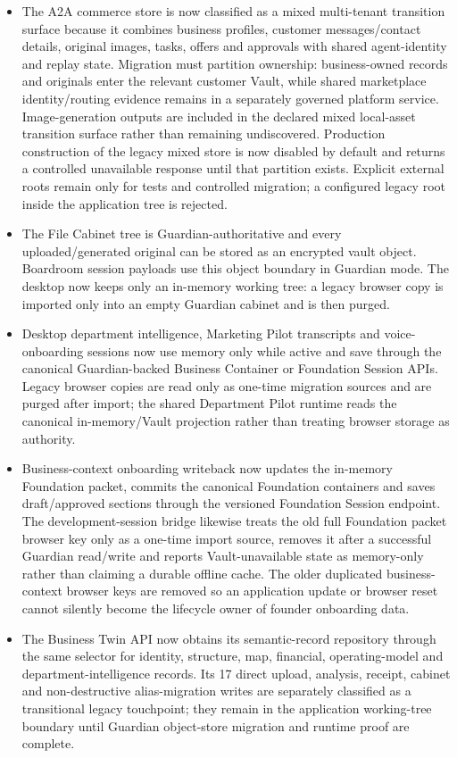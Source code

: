 \documentclass[11pt]{article}
\begin{document}
\begin{itemize}
  \item The A2A commerce store is now classified as a mixed multi-tenant transition surface because it combines business profiles, customer messages/contact details, original images, tasks, offers and approvals with shared agent-identity and replay state. Migration must partition ownership: business-owned records and originals enter the relevant customer Vault, while shared marketplace identity/routing evidence remains in a separately governed platform service. Image-generation outputs are included in the declared mixed local-asset transition surface rather than remaining undiscovered. Production construction of the legacy mixed store is now disabled by default and returns a controlled unavailable response until that partition exists. Explicit external roots remain only for tests and controlled migration; a configured legacy root inside the application tree is rejected.
  \item The File Cabinet tree is Guardian-authoritative and every uploaded/generated original can be stored as an encrypted vault object. Boardroom session payloads use this object boundary in Guardian mode. The desktop now keeps only an in-memory working tree: a legacy browser copy is imported only into an empty Guardian cabinet and is then purged.
  \item Desktop department intelligence, Marketing Pilot transcripts and voice-onboarding sessions now use memory only while active and save through the canonical Guardian-backed Business Container or Foundation Session APIs. Legacy browser copies are read only as one-time migration sources and are purged after import; the shared Department Pilot runtime reads the canonical in-memory/Vault projection rather than treating browser storage as authority.
  \item Business-context onboarding writeback now updates the in-memory Foundation packet, commits the canonical Foundation containers and saves draft/approved sections through the versioned Foundation Session endpoint. The development-session bridge likewise treats the old full Foundation packet browser key only as a one-time import source, removes it after a successful Guardian read/write and reports Vault-unavailable state as memory-only rather than claiming a durable offline cache. The older duplicated business-context browser keys are removed so an application update or browser reset cannot silently become the lifecycle owner of founder onboarding data.
  \item The Business Twin API now obtains its semantic-record repository through the same selector for identity, structure, map, financial, operating-model and department-intelligence records. Its 17 direct upload, analysis, receipt, cabinet and non-destructive alias-migration writes are separately classified as a transitional legacy touchpoint; they remain in the application working-tree boundary until Guardian object-store migration and runtime proof are complete.

\end{itemize}
\end{document}
